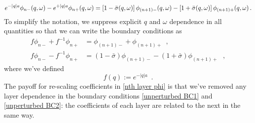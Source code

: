 \begin{equation}
    \label{superlattice discont init expression}
    e^{-|q|a} \phi_{n-}(q,\omega) - e^{+|q|a}\phi_{n+}(q,\omega) = 
   \left[1-\bar\sigma(q,\omega)\right] \phi_{(n+1)-}(q,\omega)-\left[1+\bar\sigma(q,\omega)\right] \phi_{(n+1)+}(q,\omega)
   \,.
\end{equation}
To simplify the notation, we suppress explicit $q$ and $\omega$ dependence in all quantities so that we can write the boundary conditions as
\begin{align}
    \label{unperturbed BC1}
    f \phi_{n-} + f^{-1}\phi_{n+} &= \phi_{(n+1)-} + \phi_{(n+1)+}
    \,\,\,,
    \\
    \label{unperturbed BC2}
    f \phi_{n-} - f^{-1}\phi_{n+} &= (1-\bar\sigma)\phi_{(n+1)-}-(1+\bar\sigma)\phi_{(n+1)+}
    \,\,\,\,,
\end{align}
where we've defined
\begin{equation}
    \label{f def}
    f(q):=e^{-|q|a}
    \,\,\,.
\end{equation}
The payoff for re-scaling coefficients in \eqref{nth layer phi} is that we've  removed any layer dependence in the boundary conditions \eqref{unperturbed BC1} and \eqref{unperturbed BC2}: the coefficients of each layer are related to the next in the same way.


